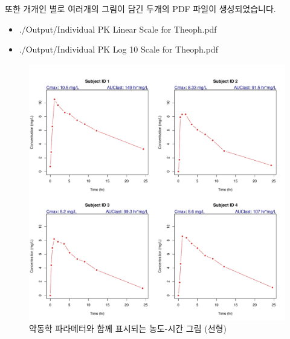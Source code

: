 \documentclass[
  12pt,
]{krantz}
\providecommand{\tightlist}{%
  \setlength{\itemsep}{0pt}\setlength{\parskip}{0pt}}
\begin{document}
또한 개개인 별로 여러개의 그림이 담긴 두개의 PDF 파일이 생성되었습니다.

\begin{itemize}
\tightlist
\item
  ./Output/Individual PK Linear Scale for Theoph.pdf
\item
  ./Output/Individual PK Log 10 Scale for Theoph.pdf
\end{itemize}

\begin{figure}
\includegraphics[width=1\linewidth]{Output/Individual PK Linear Scale for Theoph} \caption{약동학 파라메터와 함께 표시되는 농도-시간 그림 (선형)}\label{fig:unnamed-chunk-8}
\end{figure}
\end{document}
